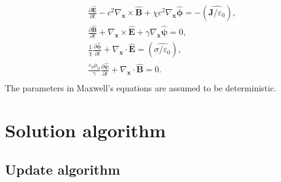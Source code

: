 \documentclass[preprint,3p,12pt,sort&compress]{elsarticle}
\begin{document}
\begin{equation}
\begin{aligned}
&\frac{\partial \hat{\boldsymbol E}} {\partial t} - c^2 \nabla_\mathbf x \times \hat{\boldsymbol B} + \chi c^2 \nabla_\mathbf x \hat{\boldsymbol \phi} = -  (\hat{\boldsymbol J / \varepsilon_0}), \\
&\frac{\partial \hat{\boldsymbol B}}{\partial t} + \nabla_\mathbf x \times \hat{\boldsymbol E} + \gamma \nabla_\mathbf x \hat {\boldsymbol \psi}= 0, \\
&\frac{1}{\chi} \frac{\partial \hat{\boldsymbol \phi}}{\partial t} + \nabla_\mathbf x \cdot \hat{\boldsymbol E} = (\hat{ \sigma/\varepsilon_0}), \\
&\frac{\varepsilon_0 \mu_0}{\gamma} \frac{\partial \hat {\boldsymbol \psi}}{\partial t} + \nabla_\mathbf x \cdot \hat{\boldsymbol B} = 0. \\
\end{aligned}
\label{eqn:sg phm}
\end{equation}
The parameters in Maxwell's equations are assumed to be deterministic.

\section{Solution algorithm} \label{sec:solution algorithm}

\subsection{Update algorithm}
\end{document}
